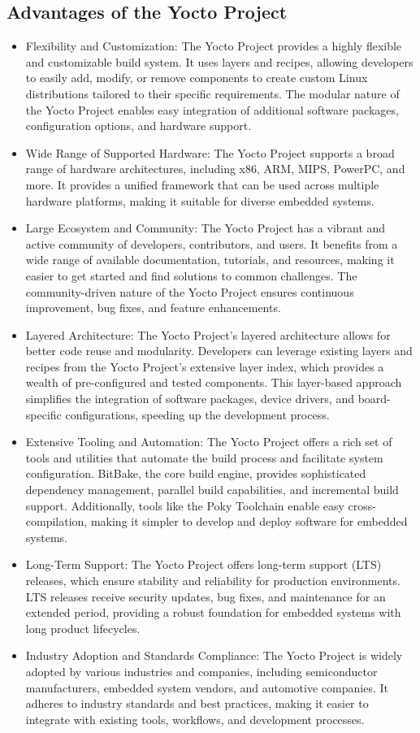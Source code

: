 \documentclass[
12pt,
oneside, 
onehalfspacing, 
nolistspacing, 
parskip, 
chapterinoneline, 
]{AASTCOMPUTER}
\begin{document}
\subsection{Advantages of the Yocto Project}
\begin{itemize}
    \item Flexibility and Customization: The Yocto Project provides a highly flexible and customizable build system. It uses layers and recipes, allowing developers to easily add, modify, or remove components to create custom Linux distributions tailored to their specific requirements. The modular nature of the Yocto Project enables easy integration of additional software packages, configuration options, and hardware support.
    \item Wide Range of Supported Hardware: The Yocto Project supports a broad range of hardware architectures, including x86, ARM, MIPS, PowerPC, and more. It provides a unified framework that can be used across multiple hardware platforms, making it suitable for diverse embedded systems.
    \item Large Ecosystem and Community: The Yocto Project has a vibrant and active community of developers, contributors, and users. It benefits from a wide range of available documentation, tutorials, and resources, making it easier to get started and find solutions to common challenges. The community-driven nature of the Yocto Project ensures continuous improvement, bug fixes, and feature enhancements.
    \item Layered Architecture: The Yocto Project's layered architecture allows for better code reuse and modularity. Developers can leverage existing layers and recipes from the Yocto Project's extensive layer index, which provides a wealth of pre-configured and tested components. This layer-based approach simplifies the integration of software packages, device drivers, and board-specific configurations, speeding up the development process.
    \item Extensive Tooling and Automation: The Yocto Project offers a rich set of tools and utilities that automate the build process and facilitate system configuration. BitBake, the core build engine, provides sophisticated dependency management, parallel build capabilities, and incremental build support. Additionally, tools like the Poky Toolchain enable easy cross-compilation, making it simpler to develop and deploy software for embedded systems.
    \item Long-Term Support: The Yocto Project offers long-term support (LTS) releases, which ensure stability and reliability for production environments. LTS releases receive security updates, bug fixes, and maintenance for an extended period, providing a robust foundation for embedded systems with long product lifecycles.
    \item Industry Adoption and Standards Compliance: The Yocto Project is widely adopted by various industries and companies, including semiconductor manufacturers, embedded system vendors, and automotive companies. It adheres to industry standards and best practices, making it easier to integrate with existing tools, workflows, and development processes.
\end{itemize}
\end{document}
